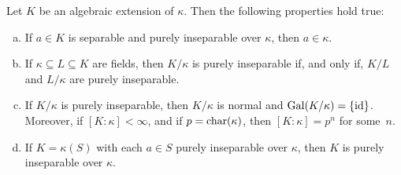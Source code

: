 \begin{prop}\label{prop:purely-inseparable-properties}
    Let\/ $K$ be an algebraic extension of\/ $\kappa$. Then the following properties hold true:
    \begin{enumerate}[a), font=\upshape]
        \item If\/ $a \in K$ is separable and purely inseparable over\/ $\kappa$, then\/ $a \in \kappa$.

        \item If\/ $\kappa \subseteq L \subseteq K$ are fields, then\/ $K / \kappa$ is purely inseparable if, and only if, $K / L$ and\/ $L / \kappa$ are purely inseparable.
        
        \item If\/ $K / \kappa$ is purely inseparable, then\/ $K / \kappa$ is normal and\/ $\operatorname{Gal}(K / \kappa) = \{\operatorname{id}\}$. Moreover, if\/ $[K : \kappa] < \infty$, and if\/ $p = \operatorname{char}(\kappa)$, then\/ $[K : \kappa] = p^n$ for some\/~$n$.
        
        \item If\/ $K = \kappa(S)$ with each\/ $a \in S$ purely inseparable over\/ $\kappa$, then\/ $K$ is purely inseparable over\/ $\kappa$.
    \end{enumerate}
\end{prop}

